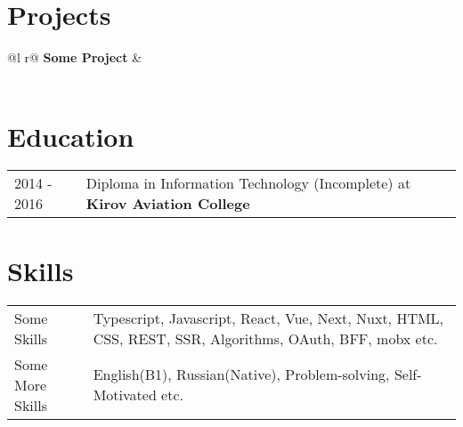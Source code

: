 \documentclass[a4paper,12pt]{article}
\begin{document}
\section{Projects}

\begin{tabularx}{\linewidth}{ @{}l r@{} }
\textbf{Some Project} & \hfill \href{}{} \\[3.75pt]
  \\
\end{tabularx}

\section{Education}
\begin{tabularx}{\linewidth}{@{}l X@{}}	
2014 - 2016 & Diploma in Information Technology (Incomplete) at \textbf{Kirov Aviation College} \hfill \normalsize  \\
\end{tabularx}

\section{Skills}
\begin{tabularx}{\linewidth}{@{}l X@{}}
Some Skills &  \normalsize{Typescript, Javascript, React, Vue, Next, Nuxt, HTML, CSS, REST, SSR, Algorithms, OAuth, BFF, mobx etc.}\\
Some More Skills  &  \normalsize{English(B1), Russian(Native), Problem-solving, Self-Motivated etc.}\\  
\end{tabularx}

\vfill
{}
\end{document}
